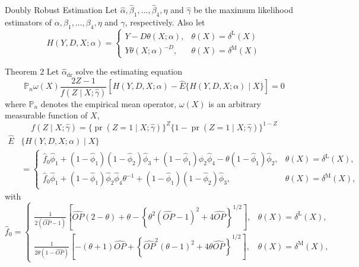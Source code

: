 \documentclass[aspectratio=169,xcolor=dvipsnames]{beamer}
\begin{document}
\begin{frame}{Doubly Robust Estimation}
Let $\hat{\alpha}, \hat{\beta}_{1}, \ldots, \hat{\beta}_{4}, \hat{\eta}$ and $\hat{\gamma}$ be the maximum likelihood estimators of $\alpha, \beta_{1}, \ldots, \beta_{4}, \eta$ and $\gamma$, respectively. Also let
$$
H(Y, D, X ; \alpha)= \begin{cases}Y-D \theta(X ; \alpha), & \theta(X)=\delta^{\mathrm{L}}(X) \\ Y \theta(X ; \alpha)^{-D}, & \theta(X)=\delta^{\mathrm{M}}(X)\end{cases}
$$
\end{frame}

\begin{frame}{Theorem 2}
Let $\hat{\alpha}_{\mathrm{dr}}$ solve the estimating equation
$$
\mathbb{P}_{n} \omega(X) \frac{2 Z-1}{f(Z \mid X ; \hat{\gamma})}[H(Y, D, X ; \alpha)-\hat{E}\{H(Y, D, X ; \alpha) \mid X\}]=0
$$
where $\mathbb{P}_{n}$ denotes the empirical mean operator, $\omega(X)$ is an arbitrary measurable function of $X$,
$$
f(Z \mid X ; \hat{\gamma})=\{\operatorname{pr}(Z=1 \mid X ; \hat{\gamma})\}^{Z}\{1-\operatorname{pr}(Z=1 \mid X ; \hat{\gamma})\}^{1-Z}
$$
$$
\begin{aligned}
\hat{E} &\{H(Y, D, X ; \alpha) \mid X\} \\
&= \begin{cases}\hat{f}_{0} \hat{\phi}_{1}+\left(1-\hat{\phi}_{1}\right)\left(1-\hat{\phi}_{2}\right) \hat{\phi}_{3}+\left(1-\hat{\phi}_{1}\right) \hat{\phi}_{2} \hat{\phi}_{4}-\theta\left(1-\hat{\phi}_{1}\right) \hat{\phi}_{2}, & \theta(X)=\delta^{\mathrm{L}}(X), \\
\hat{f}_{0} \hat{\phi}_{1}+\left(1-\hat{\phi}_{1}\right) \hat{\phi}_{2} \hat{\phi}_{4} \theta^{-1}+\left(1-\hat{\phi}_{1}\right)\left(1-\hat{\phi}_{2}\right) \hat{\phi}_{3}, & \theta(X)=\delta^{\mathrm{M}}(X),\end{cases}
\end{aligned}
$$
with
$$
\hat{f}_{0}= \begin{cases}\frac{1}{2(\hat{O P}-1)}\left[\hat{O P}(2-\theta)+\theta-\left\{\theta^{2}(\hat{O P}-1)^{2}+4 \hat{O P}\right\}^{1 / 2}\right], & \theta(X)=\delta^{\mathrm{L}}(X), \\ \frac{1}{2 \theta(1-\hat{O P})}\left[-(\theta+1) \hat{O P}+\left\{\hat{O P}^{2}(\theta-1)^{2}+4 \theta \hat{O P}\right\}^{1 / 2}\right], & \theta(X)=\delta^{\mathrm{M}}(X),\end{cases}
$$
\end{frame}
\end{document}
